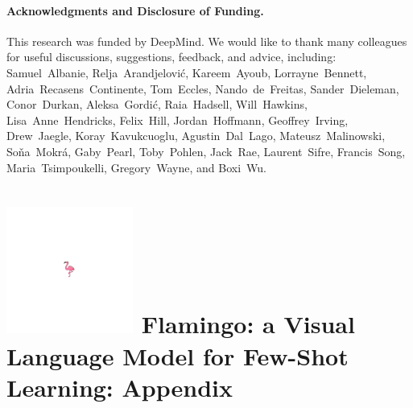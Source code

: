 \documentclass{article}
\newcommand{\flamingoemoji}{\includegraphics[height=1.3\fontcharht\font`\B]{figures/flamingoemoji.pdf}}
\newif\ifwithappendix
\begin{document}



\paragraph{Acknowledgments and Disclosure of Funding.}
This research was funded by DeepMind.
We would like to thank many colleagues for useful discussions, suggestions, feedback, and advice, including:
Samuel~Albanie,
Relja~Arandjelović,
Kareem~Ayoub,
Lorrayne~Bennett,
Adria~Recasens~Continente,
Tom~Eccles,
Nando~de~Freitas,
Sander~Dieleman,
Conor~Durkan,
Aleksa~Gordić,
Raia~Hadsell,
Will~Hawkins,
Lisa~Anne~Hendricks,
Felix~Hill,
Jordan~Hoffmann,
Geoffrey~Irving,
Drew~Jaegle,
Koray~Kavukcuoglu,
Agustin~Dal~Lago,
Mateusz~Malinowski,
Soňa~Mokrá,
Gaby~Pearl,
Toby~Pohlen,
Jack~Rae,
Laurent~Sifre,
Francis~Song,
Maria~Tsimpoukelli,
Gregory~Wayne,
and Boxi~Wu.








\newpage
\ifwithappendix
\section*{Appendix}
\else
\section*{\flamingoemoji{} Flamingo: a Visual Language Model for Few-Shot Learning: Appendix}
\fi
\appendix




\end{document}
